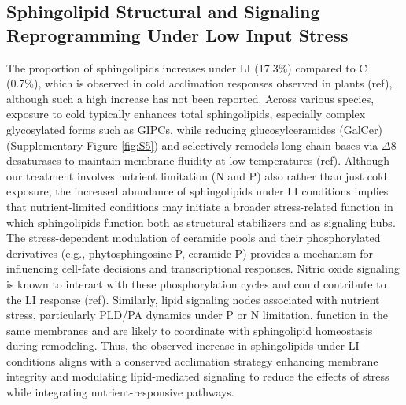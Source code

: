\documentclass[10pt,letterpaper]{article}
\begin{document}
\begin{itemize}
\subsection*{Sphingolipid Structural and Signaling Reprogramming Under Low Input Stress}
The proportion of sphingolipids increases under LI (17.3\%) compared to C (0.7\%), which is observed in cold acclimation responses observed in plants (ref), although such a high increase has not been reported. Across various species, exposure to cold typically enhances total sphingolipids, especially complex glycosylated forms such as GIPCs, while reducing glucosylceramides (GalCer) (Supplementary Figure \ref{fig:S5}) and selectively remodels long-chain bases via $\Delta$8 desaturases to maintain membrane fluidity at low temperatures  (ref). Although our treatment involves nutrient limitation (N and P) also rather than just cold exposure, the increased abundance of sphingolipids under LI conditions implies that nutrient-limited conditions may initiate a broader stress-related function in which sphingolipids function both as structural stabilizers and as signaling hubs. The stress-dependent modulation of ceramide pools and their phosphorylated derivatives (e.g., phytosphingosine-P, ceramide-P) provides a mechanism for influencing cell-fate decisions and transcriptional responses. Nitric oxide signaling is known to interact with these phosphorylation cycles and could contribute to the LI response (ref). Similarly, lipid signaling nodes associated with nutrient stress, particularly PLD/PA dynamics under P or N limitation, function in the same membranes and are likely to coordinate with sphingolipid homeostasis during remodeling. Thus, the observed increase in sphingolipids under LI conditions aligns with a conserved acclimation strategy enhancing membrane integrity and modulating lipid-mediated signaling to reduce the effects of stress while integrating nutrient-responsive pathways. 


\end{itemize}
\end{document}
